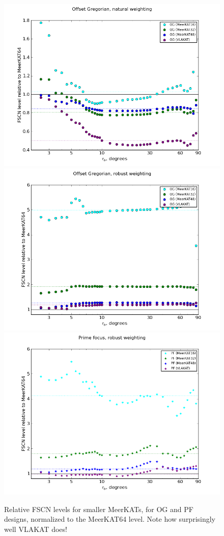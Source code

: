 \documentclass{aa}
\begin{document}
\begin{figure}
  \includegraphics[width=.33\textwidth]{cc-meerkatjes-ratio-og-nat}\hfill%
  \includegraphics[width=.33\textwidth]{cc-meerkatjes-ratio-og}\hfill%
  \includegraphics[width=.33\textwidth]{cc-meerkatjes-ratio-pf}
\caption{\label{fig:fscn-meerkatjes-relative}Relative FSCN levels for smaller MeerKATs, for OG and PF designs, normalized to the MeerKAT64 level. Note how surprisingly well VLAKAT does!}

\end{figure}
\end{document}
